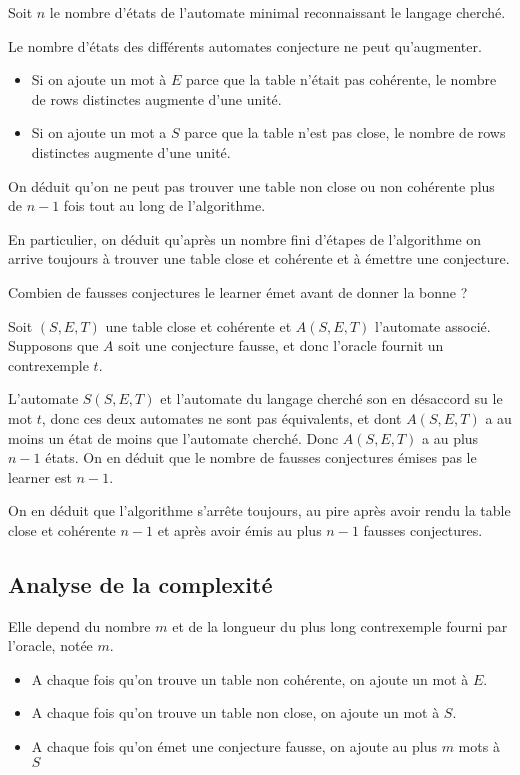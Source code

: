 Soit $n$ le nombre d'états de l'automate minimal reconnaissant le langage cherché.

\begin{remarque}
	Le nombre d'états des différents automates conjecture ne peut qu'augmenter.
	\begin{itemize}
		\item Si on ajoute un mot à $E$ parce que la table n'était pas cohérente, le nombre de rows distinctes augmente
		      d'une unité.
		\item Si on ajoute un mot a $S$ parce que la table n'est pas close, le nombre de rows distinctes augmente d'une unité.
	\end{itemize}
	On déduit qu'on ne peut pas trouver une table non close ou non cohérente plus de $n-1$ fois tout au long de l'algorithme.

	En particulier, on déduit qu'après un nombre fini d'étapes de l'algorithme on arrive toujours à trouver
	une table close et cohérente et à émettre une conjecture.
\end{remarque}


Combien de fausses conjectures  le learner émet avant de donner la bonne ?

Soit $(S,E,T)$ une table close et cohérente et $A(S,E,T)$ l'automate associé.
Supposons que $A$ soit une conjecture fausse, et donc l'oracle fournit un contrexemple $t$.

L'automate $S(S,E,T)$ et l'automate du langage cherché son en désaccord su le mot $t$, donc ces deux automates
ne sont pas équivalents, et dont $A(S,E,T)$ a au moins un état de moins que l'automate cherché.
Donc $A(S,E,T)$ a au plus $n-1$ états. On en déduit que le nombre de fausses conjectures émises pas le learner est $n-1$.

On en déduit que l'algorithme s'arrête toujours, au pire après avoir rendu la table close et
cohérente $n-1$ et après avoir émis au plus $n-1$ fausses conjectures.


\subsection{Analyse de la complexité}

Elle depend du nombre $m$ et de la longueur du plus long contrexemple fourni par l'oracle, notée $m$.


\begin{itemize}
	\item A chaque fois qu'on trouve un table non cohérente, on ajoute un mot à $E$.
	\item A chaque fois qu'on trouve un table non close, on ajoute un mot à $S$.
	\item A chaque fois qu'on émet une conjecture fausse, on ajoute au plus $m$ mots à $S$
\end{itemize}

